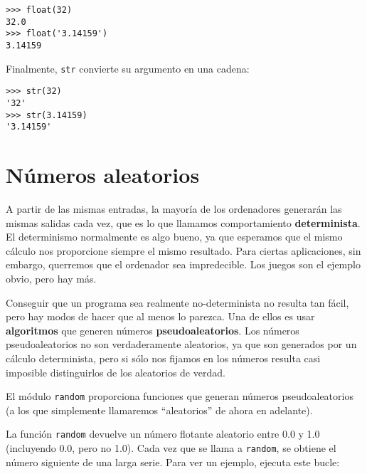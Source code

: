 
\beforeverb
\begin{verbatim}
>>> float(32)
32.0
>>> float('3.14159')
3.14159
\end{verbatim}
\afterverb
%
Finalmente, {\tt str} convierte su argumento en una cadena:


\beforeverb
\begin{verbatim}
>>> str(32)
'32'
>>> str(3.14159)
'3.14159'
\end{verbatim}
\afterverb
%

\section{Números aleatorios}


A partir de las mismas entradas, la mayoría de los ordenadores generarán
las mismas salidas cada vez, que es lo que llamamos comportamiento {\bf determinista}.
El determinismo normalmente es algo bueno, ya que esperamos que el mismo
cálculo nos proporcione siempre el mismo resultado. Para ciertas aplicaciones, sin embargo,
querremos que el ordenador sea impredecible. Los juegos son el ejemplo
obvio, pero hay más.

Conseguir que un programa sea realmente no-determinista no resulta tan fácil,
pero hay modos de hacer que al menos lo parezca. Una de ellos
es usar {\bf algoritmos} que generen números {\bf pseudoaleatorios}.
Los números pseudoaleatorios no son verdaderamente aleatorios, ya que son
generados por un cálculo determinista, pero si sólo nos fijamos en los números
resulta casi imposible distinguirlos de los aleatorios de verdad.


El módulo {\tt random} proporciona funciones que generan
números pseudoaleatorios (a los que simplemente llamaremos ``aleatorios''
de ahora en adelante).


La función {\tt random} devuelve un número flotante aleatorio
entre 0.0 y 1.0 (incluyendo 0.0, pero no 1.0). Cada vez que se
llama a {\tt random}, se obtiene el número siguiente de una larga serie. Para ver
un ejemplo, ejecuta este bucle:

